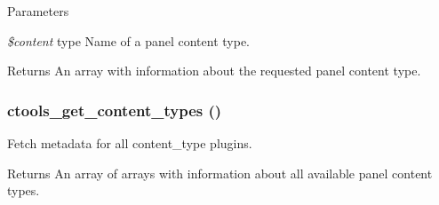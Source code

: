 \begin{DoxyParams}{Parameters}
\item[{\em \$content}]type Name of a panel content type.\end{DoxyParams}
\begin{DoxyReturn}{Returns}
An array with information about the requested panel content type. 
\end{DoxyReturn}
\hypertarget{content_8inc_ae76cc86416c34ae727a2261cb158f1b6}{
\subsubsection[{ctools\_\-get\_\-content\_\-types}]{\setlength{\rightskip}{0pt plus 5cm}ctools\_\-get\_\-content\_\-types ()}}
\label{content_8inc_ae76cc86416c34ae727a2261cb158f1b6}
Fetch metadata for all content\_\-type plugins.

\begin{DoxyReturn}{Returns}
An array of arrays with information about all available panel content types. 
\end{DoxyReturn}
